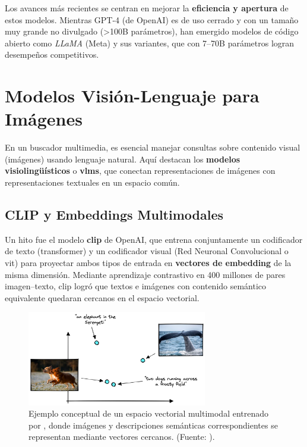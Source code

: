 Los avances más recientes se centran en mejorar la \textbf{eficiencia y apertura} de estos modelos. Mientras GPT-4 (de OpenAI) es de uso cerrado y con un tamaño muy grande no divulgado (>100B parámetros), han emergido modelos de código abierto como \emph{LLaMA} (Meta) y sus variantes, que con 7--70B parámetros logran desempeños competitivos.

\section{Modelos Visión-Lenguaje para Imágenes}

En un buscador multimedia, es esencial manejar consultas sobre contenido visual (imágenes) usando lenguaje natural. Aquí destacan los \textbf{modelos visiolingüísticos} o \textbf{\glspl{vlm}}, que conectan representaciones de imágenes con representaciones textuales en un espacio común.

\subsection{CLIP y Embeddings Multimodales}

Un hito fue el modelo \textbf{\gls{clip}} de OpenAI, que entrena conjuntamente un codificador de texto (transformer) y un codificador visual (Red Neuronal Convolucional o \gls{vit}) para proyectar ambos tipos de entrada en \textbf{vectores de embedding} de la misma dimensión. Mediante aprendizaje contrastivo en 400 millones de pares imagen--texto, \gls{clip} logró que textos e imágenes con contenido semántico equivalente quedaran cercanos en el espacio vectorial.

\begin{figure}[h]
  \centering
  \includegraphics[width=0.7\textwidth]{archivos/clip_space.png}
  \caption[Espacio vectorial multimodal de CLIP]{Ejemplo conceptual de un espacio vectorial multimodal entrenado por , donde imágenes y descripciones semánticas correspondientes se representan mediante vectores cercanos. (Fuente: \citep{noauthor_multi-modal_nodate}).}
  \label{fig:clip_space}
\end{figure}

